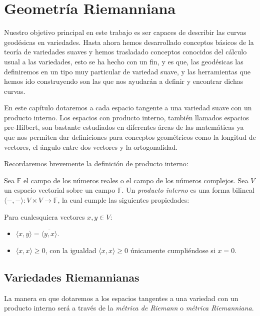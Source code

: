 \chapter{Geometría Riemanniana}\label{Capítulo: Geometría Riemanniana}

Nuestro objetivo principal en este trabajo es ser capaces de describir las curvas geodésicas en variedades. Hasta ahora hemos desarrollado conceptos básicos de la teoría de variedades suaves y hemos trasladado conceptos conocidos del cálculo usual a las variedades, esto se ha hecho con un fin, y es que, las geodésicas las definiremos en un tipo muy particular de variedad suave, y las herramientas que hemos ido construyendo son las que nos ayudarán a definir y encontrar dichas curvas.

En este capítulo dotaremos a cada espacio tangente a una variedad suave con un producto interno. Los espacios con producto interno, también llamados espacios pre-Hilbert, son bastante estudiados en diferentes áreas de las matemáticas ya que nos permiten dar definiciones para conceptos geométricos como la longitud de vectores, el ángulo entre dos vectores y la ortogonalidad.

Recordaremos brevemente la definición de producto interno:

\begin{definition}
	Sea $\mathbb{F}$ el campo de los números reales o el campo de los números complejos. Sea $V$ un espacio vectorial sobre un campo $\mathbb{F}$. Un \textit{producto interno} es una forma bilineal $\langle -,-\rangle: V \times V \to \mathbb{F}$, la cual cumple las siguientes propiedades:

	Para cualesquiera vectores $x,y \in V$:

	\begin{itemize}
		\item $\langle x,y \rangle = \overline{\langle y, x\rangle}$.
		\item $\langle x,x \rangle \geq 0$, con la igualdad $\langle x,x \rangle \geq 0$ únicamente cumpliéndose si $x = 0$.
	\end{itemize}
\end{definition}

\section{Variedades Riemannianas}
La manera en que dotaremos a los espacios tangentes a una variedad con un producto interno será a través de la \textit{métrica de Riemann} o \textit{métrica Riemanniana}.

